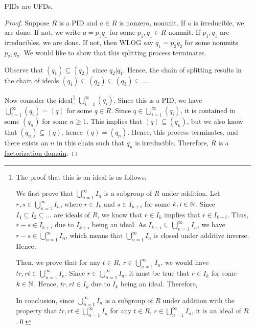 \documentclass[12pt]{article}
\begin{document}
\begin{proposition}
    PIDs are UFDs.
\end{proposition}
\begin{proof}
    Suppose $R$ is a PID and $a\in R$ is nonzero, nonunit. If $a$ is irreducible, we are done. If not, we write $a=p_1q_1$ for some $p_1,q_1\in R$ nonunit. If $p_1,q_1$ are irreducibles, we are done. If not, then WLOG say $q_1=p_2q_2$ for some nonunits $p_2,q_2$. We would like to show that this splitting process terminates.

    Observe that $(q_1)\subseteq (q_2)$ since $q_2|q_1$. Hence, the chain of splitting results in the chain of ideals $(q_1)\subseteq (q_2)\subseteq (q_3)\subseteq \dots$.

    Now consider the ideal\footnote{The proof that this is an ideal is as follows:
    
    We first prove that $\bigcup_{n=1}^\infty I_n$ is a subgroup of $R$ under addition. Let $r,s\in \bigcup_{n=1}^\infty I_n$, where $r\in I_k$ and $s\in I_{k+i}$ for some $k,i\in \mathbb{N}$. Since $I_1\subseteq I_2\subseteq \dots$ are ideals of $R$, we know that $r\in I_k$ implies that $r\in I_{k+i}$. Thus, $r-s\in I_{k+i}$ due to $I_{k+i}$ being an ideal. As $I_{k+i}\subseteq \bigcup_{n=1}^\infty I_n$, we have $r-s\in \bigcup_{n=1}^\infty I_n$, which means that $\bigcup_{n=1}^\infty I_n$ is closed under additive inverse. Hence, 

Then, we prove that for any $t\in R$, $r\in \bigcup_{n=1}^\infty I_n$, we would have $tr,rt\in \bigcup_{n=1}^\infty I_n$. Since $r\in \bigcup_{n=1}^\infty I_n$, it must be true that $r\in I_k$ for some $k\in \mathbb{N}$. Hence, $tr,rt \in I_k$  due to $I_{k}$ being an ideal. Therefore, 

In conclusion, since $\bigcup_{n=1}^\infty I_n$ is a subgroup of $R$ under addition with the property that $tr,rt \in \bigcup_{n=1}^\infty I_n$ for any $t\in R$, $r\in \bigcup_{n=1}^\infty I_n$, it is an ideal of $R$.\qed
} $\bigcup_{i=1}^{\infty}(q_i)$. Since this is a PID, we have $\bigcup_{i=1}^{\infty}(q_i)=(q)$ for some $q\in R$. Since $q\in \bigcup_{i=1}^{\infty}(q_i)$, it is contained in some $(q_n)$ for some $n\geq 1$. This implies that $(q)\subseteq (q_n)$, but we also know that $(q_n)\subseteq (q)$, hence $(q)=(q_n)$. Hence, this process terminates, and there exists an $n$ in this chain such that $q_n$ is irreducible. Therefore, $R$ is a \uline{factorization domain}.


\end{proof}
\end{document}
